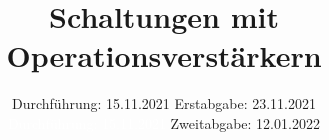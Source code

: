 
\setlength\parindent{0pt}
\subject{V51}
\title{Schaltungen mit Operationsverstärkern}
\date{%
  Durchführung: 15.11.2021
  \hspace{3em}
  Erstabgabe: 23.11.2021 \\
  \textcolor{white}{Durchführung: 15.11.2021} \hspace{3em} Zweitabgabe: 12.01.2022
}



\maketitle
\thispagestyle{empty}
\tableofcontents
\newpage







\newpage
\nocite{*}
\printbibliography
\appendix
\newpage



